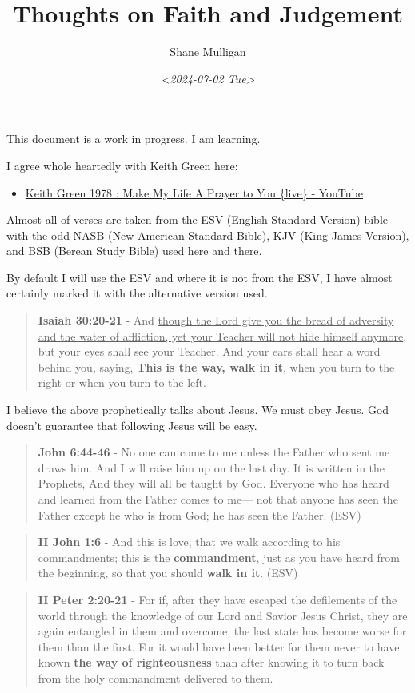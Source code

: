 \documentclass[11pt]{article}
\author{Shane Mulligan}
\date{\textit{<2024-07-02 Tue>}}
\title{Thoughts on Faith and Judgement}
\begin{document}
\maketitle
This document is a work in progress. I am learning.

I agree whole heartedly with Keith Green here:
\begin{itemize}
\item \href{https://www.youtube.com/watch?v=z7oCa9BvO9g}{Keith Green 1978 : Make My Life A Prayer to You \{live\} - YouTube}
\end{itemize}

Almost all of verses are taken from the ESV
(English Standard Version) bible with the odd NASB
(New American Standard Bible), KJV (King
James Version), and BSB (Berean Study Bible) used here and there.

By default I will use the ESV and where it is
not from the ESV, I have almost certainly marked it with the alternative version used.

\begin{quote}
\textbf{Isaiah 30:20-21} - And \uline{though the Lord give you the bread of adversity and the water of affliction, yet your Teacher will not hide himself anymore}, but your eyes shall see your Teacher. And your ears shall hear a word behind you, saying, \textbf{This is the way, walk in it}, when you turn to the right or when you turn to the left.
\end{quote}

I believe the above prophetically talks about Jesus. We must obey Jesus. God doesn't guarantee that following Jesus will be easy.

\begin{quote}
\textbf{John 6:44-46} - No one can come to me unless the Father who sent me draws him. And I will raise him up on the last day. It is written in the Prophets, And they will all be taught by God. Everyone who has heard and learned from the Father comes to me— not that anyone has seen the Father except he who is from God; he has seen the Father. (ESV)
\end{quote}

\begin{quote}
\textbf{II John 1:6} - And this is love, that we walk according to his commandments; this is the \textbf{commandment}, just as you have heard from the beginning, so that you should \textbf{walk in it}. (ESV)
\end{quote}

\begin{quote}
\textbf{II Peter 2:20-21} - For if, after they have escaped the defilements of the world through the knowledge of our Lord and Savior Jesus Christ, they are again entangled in them and overcome, the last state has become worse for them than the first. For it would have been better for them never to have known \textbf{the way of righteousness} than after knowing it to turn back from the holy commandment delivered to them.
\end{quote}
\end{document}
